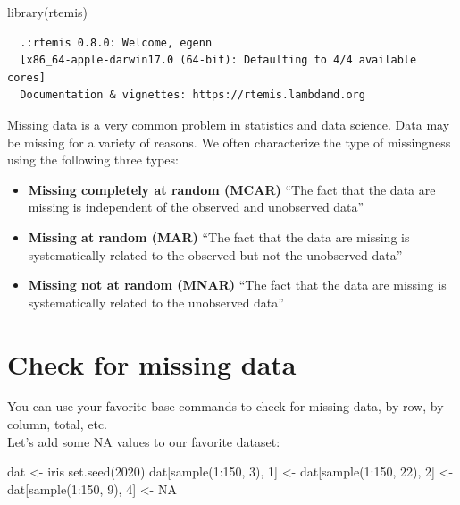 \documentclass[
]{book}
\newenvironment{Shaded}{\begin{snugshade}}{\end{snugshade}}
\newcommand{\ConstantTok}[1]{\textcolor[rgb]{0.00,0.00,0.00}{#1}}
\newcommand{\DecValTok}[1]{\textcolor[rgb]{0.00,0.00,0.81}{#1}}
\newcommand{\FunctionTok}[1]{\textcolor[rgb]{0.00,0.00,0.00}{#1}}
\newcommand{\NormalTok}[1]{#1}
\newcommand{\OtherTok}[1]{\textcolor[rgb]{0.56,0.35,0.01}{#1}}
\newcommand{\SpecialCharTok}[1]{\textcolor[rgb]{0.00,0.00,0.00}{#1}}
\providecommand{\tightlist}{%
  \setlength{\itemsep}{0pt}\setlength{\parskip}{0pt}}
\begin{document}
\begin{Shaded}
\begin{Highlighting}[]
\FunctionTok{library}\NormalTok{(rtemis)}
\end{Highlighting}
\end{Shaded}

\begin{verbatim}
  .:rtemis 0.8.0: Welcome, egenn
  [x86_64-apple-darwin17.0 (64-bit): Defaulting to 4/4 available cores]
  Documentation & vignettes: https://rtemis.lambdamd.org
\end{verbatim}

Missing data is a very common problem in statistics and data science. Data may be missing for a variety of reasons. We often characterize the type of missingness using the following three types:

\begin{itemize}
\tightlist
\item
  \textbf{Missing completely at random (MCAR)}
  ``The fact that the data are missing is independent of the observed and unobserved data''
\item
  \textbf{Missing at random (MAR)}
  ``The fact that the data are missing is systematically related to the observed but not the unobserved data''
\item
  \textbf{Missing not at random (MNAR)}
  ``The fact that the data are missing is systematically related to the unobserved data''
\end{itemize}

\hypertarget{check-for-missing-data}{%
\section{Check for missing data}\label{check-for-missing-data}}

You can use your favorite base commands to check for missing data, by row, by column, total, etc.\\
Let's add some NA values to our favorite dataset:

\begin{Shaded}
\begin{Highlighting}[]
\NormalTok{dat }\OtherTok{\textless{}{-}}\NormalTok{ iris}
\FunctionTok{set.seed}\NormalTok{(}\DecValTok{2020}\NormalTok{)}
\NormalTok{dat[}\FunctionTok{sample}\NormalTok{(}\DecValTok{1}\SpecialCharTok{:}\DecValTok{150}\NormalTok{, }\DecValTok{3}\NormalTok{), }\DecValTok{1}\NormalTok{] }\OtherTok{\textless{}{-}}\NormalTok{ dat[}\FunctionTok{sample}\NormalTok{(}\DecValTok{1}\SpecialCharTok{:}\DecValTok{150}\NormalTok{, }\DecValTok{22}\NormalTok{), }\DecValTok{2}\NormalTok{] }\OtherTok{\textless{}{-}}\NormalTok{ dat[}\FunctionTok{sample}\NormalTok{(}\DecValTok{1}\SpecialCharTok{:}\DecValTok{150}\NormalTok{, }\DecValTok{9}\NormalTok{), }\DecValTok{4}\NormalTok{] }\OtherTok{\textless{}{-}} \ConstantTok{NA}
\end{Highlighting}
\end{Shaded}
\end{document}
